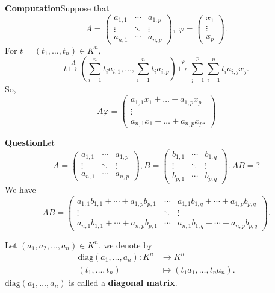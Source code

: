 \begin{box2}
\textbf{Computation}\quad Suppose that 
$$A=\begin{pmatrix}  
  a_{1,1} & \cdots & a_{1,p} \\  
  \vdots & \ddots & \vdots \\  
  a_{n,1} & \cdots & a_{n,p}  
\end{pmatrix} ,\ \varphi =\begin{pmatrix}
 x_1\\
 \vdots\\
x_p

\end{pmatrix}.$$
For $t=(t_1, \dots, t_n)\in K^n$, 
$$t\overset{A}{\longmapsto}\left(\sum_{i=1}^{n}t_ia_{i,1},\dots,\sum_{i=1}^{n}t_ia_{i,p} \right)\overset{\varphi}{\longmapsto}\sum_{j=1}^{p}\sum_{i=1}^{n}t_ia_{i,j}x_j.$$
So, 
$$A\varphi=\begin{pmatrix}
    a_{1,1}x_1+\dots+a_{1,p}x_p\\
    \vdots\\
    a_{n,1}x_1+\dots+a_{n,p}x_p.
\end{pmatrix}$$
\end{box2}
\begin{box2}
    \textbf{Question}\quad Let 
    $$A=\begin{pmatrix}  
  a_{1,1} & \cdots & a_{1,p} \\  
  \vdots & \ddots & \vdots \\  
  a_{n,1} & \cdots & a_{n,p}  
\end{pmatrix} ,B=\begin{pmatrix}  
  b_{1,1} & \cdots & b_{1,q} \\  
  \vdots & \ddots & \vdots \\  
  b_{p,1} & \cdots & b_{p,q}  
\end{pmatrix} . \ AB=? $$
    We have
    $$AB=\begin{pmatrix}  
  a_{1,1}b_{1,1}+\cdots+a_{1,p}b_{p,1} & \cdots & a_{1,1}b_{1,q}+\cdots+a_{1,p}b_{p,q} \\  
  \vdots & \ddots & \vdots \\  
  a_{n,1}b_{1,1}+\cdots+a_{n,p}b_{p,1} & \cdots & a_{n,1}b_{1,q}+\cdots+a_{n,p}b_{p,q}  
\end{pmatrix} .$$
\end{box2}
\begin{exampleenv}
    Let $(a_1,a_2,\dots,a_n)\in K^n$, we denote by 
    \begin{align*}
        \mathrm{diag}(a_1,\dots,a_n):K^n&\longrightarrow K^n\\
        (t_1,\dots,t_n)&\longmapsto(t_1a_1,\dots,t_na_n).
    \end{align*}
    $\mathrm{diag}(a_1,\dots,a_n)$ is called a \textbf{diagonal matrix}.
\end{exampleenv}
